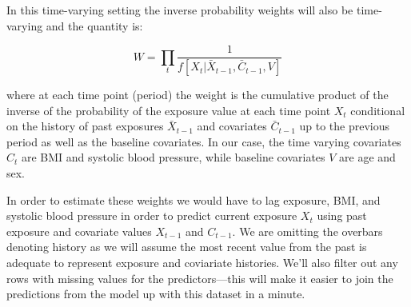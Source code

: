 \documentclass[
]{book}
\begin{document}
In this time-varying setting the inverse probability weights will also be time-varying and the quantity is:

\[
W=\prod_{t}\frac{1}{f[X_{t}|\bar{X}_{t-1},\bar{C}_{t-1},V]}
\]

where at each time point (period) the weight is the cumulative product of the inverse of the probability of the exposure value at each time point \(X_{t}\) conditional on the history of past exposures \(\bar{X}_{t-1}\) and covariates \(\bar{C}_{t-1}\) up to the previous period as well as the baseline covariates. In our case, the time varying covariates \(C_{t}\) are BMI and systolic blood pressure, while baseline covariates \(V\) are age and sex.

In order to estimate these weights we would have to lag exposure, BMI, and systolic blood pressure in order to predict current exposure \(X_{t}\) using past exposure and covariate values \(X_{t-1}\) and \(C_{t-1}\). We are omitting the overbars denoting history as we will assume the most recent value from the past is adequate to represent exposure and coviariate histories. We'll also filter out any rows with missing values for the predictors---this will make it easier to join the predictions from the model up with this dataset in a minute.
\end{document}
